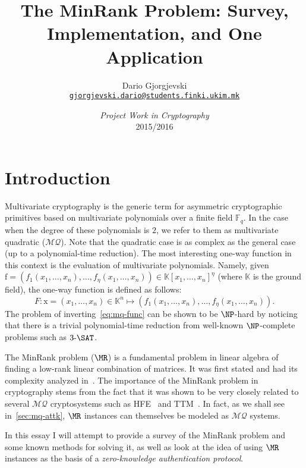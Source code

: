 \documentclass{article}
\title{The MinRank Problem: Survey, Implementation, and One Application}
\author{Dario Gjorgjevski\\
  \href{mailto:gjorgjevski.dario@students.finki.ukim.mk}
  {\texttt{gjorgjevski.dario@students.finki.ukim.mk}}}
\date{\textit{Project Work in Cryptography}\\[0.5\baselineskip]2015/2016}
\theoremstyle{remark}
\theoremstyle{definition}
\theoremstyle{plain}
\renewcommand*{\vec}[1]{\bm{\mathrm{#1}}}
\newcommand{\MQ}{\ensuremath{\mathcal{MQ}}}
\begin{document}
\maketitle

\section{Introduction}\label{sec:intro}
Multivariate cryptography is the generic term for asymmetric cryptographic
primitives based on multivariate polynomials over a finite field $\mathbb{F}_q$.
In the case when the degree of these polynomials is $2$, we refer to them as
multivariate quadratic (\MQ).  Note that the quadratic case is as complex as the
general case (up to a polynomial-time reduction).  The most interesting one-way
function in this context is the evaluation of multivariate polynomials.  Namely,
given
$\vec{f} = \left(f_1(x_1, \ldots, x_n), \ldots, f_\eta(x_1, \ldots, x_n)\right)
\in \mathbb{K}[x_1, \ldots, x_n]^\eta$ (where $\mathbb{K}$ is the ground field),
the one-way function is defined as follows:
\begin{equation}\label{eq:mq-func}
  F : \vec{x} = (x_1, \ldots, x_n) \in \mathbb{K}^n \mapsto \left(f_1(x_1,
    \ldots, x_n), \ldots, f_\eta(x_1, \ldots, x_n)\right)\text{.}
\end{equation}
The problem of inverting~\eqref{eq:mq-func} can be shown to be $\NP$-hard by
noticing that there is a trivial polynomial-time reduction from well-known
$\NP$-complete problems such as $3\text{-}\SAT$.

The MinRank problem ($\MR$) is a fundamental problem in linear algebra of
finding a low-rank linear combination of matrices.  It was first stated and had
its complexity analyzed in~\autocite{BFS99}.  The importance of the MinRank
problem in cryptography stems from the fact that it was shown to be very closely
related to several \MQ{} cryptosystems such as HFE~\autocite{Pat96,KS99} and
TTM~\autocite{Moh99, GC00}.  In fact, as we shall see in~\cref{sec:mq-attk},
$\MR$ instances can themselves be modeled as \MQ{} systems.

In this essay I will attempt to provide a survey of the MinRank problem and some
known methods for solving it, as well as look at the idea of using $\MR$
instances as the basis of a \emph{zero-knowledge authentication protocol}.
\end{document}
